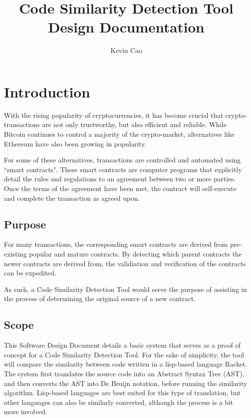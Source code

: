 \documentclass[12pt]{article}
\title{Code Similarity Detection Tool\\
Design Documentation}
\author{Kevin Cao}
\begin{document}
\maketitle

\tableofcontents

\section{Introduction}
With the rising popularity of cryptocurrencies, it has become crucial that crypto-transactions are not only trustworthy, but also efficient and reliable. While Bitcoin continues to control a majority of the crypto-market, alternatives like Ethereum have also been growing in popularity.

\hfill

For some of these alternatives, transactions are controlled and automated using ``smart contracts". These smart contracts are computer programs that explicitly detail the rules and regulations to an agreement between two or more parties. Once the terms of the agreement have been met, the contract will self-execute and complete the transaction as agreed upon.

\subsection{Purpose}
For many transactions, the corresponding smart contracts are derived from pre-existing popular and mature contracts. By detecting which parent contracts the newer contracts are derived from, the validiation and verification of the contracts can be expedited.

\hfill

As such, a Code Similarity Detection Tool would serve the purpose of assisting in the process of determining the original source of a new contract.

\subsection{Scope}

This Software Design Document details a basic system that serves as a proof of concept for a Code Similarity Detection Tool. For the sake of simplicity, the tool will compare the similarity between code written in a lisp-based language Racket. The system first translates the source code into an Abstract Syntax Tree (AST), and then converts the AST into De Bruijn notation, before running the similarity algorithm. Lisp-based languages are best suited for this type of translation, but other languages can also be similarly converted, although the process is a bit more involved.
\end{document}
